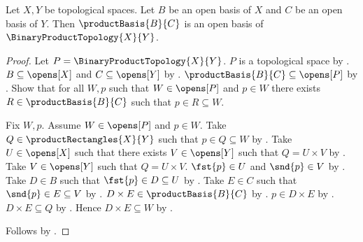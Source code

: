 \begin{theorem}\label{product_of_open_bases}
    Let $X,Y$ be topological spaces.
    Let $B$ be an open basis of $X$ and $C$ be an open basis of $Y$.
    Then $\productBasis{B}{C}$ is an open basis of $\BinaryProductTopology{X}{Y}$.
\end{theorem}
\begin{proof}
    Let $P=\BinaryProductTopology{X}{Y}$.
    $P$ is a topological space by .
    $B\subseteq\opens[X]$ and $C\subseteq\opens[Y]$ by .
    $\productBasis{B}{C}\subseteq\opens[P]$ by
        .
    Show that for all $W,p$ such that $W\in\opens[P]$ and $p\in W$
        there exists $R\in\productBasis{B}{C}$ such that $p\in R\subseteq W$.
    \begin{subproof}
        Fix $W,p$.
        Assume $W\in\opens[P]$ and $p\in W$.
        Take $Q\in\productRectangles{X}{Y}$ such that $p\in Q\subseteq W$
            by .
        Take $U\in\opens[X]$ such that there exists $V\in\opens[Y]$
            such that $Q=U\times V$ by .
        Take $V\in\opens[Y]$ such that $Q=U\times V$.
        $\fst{p}\in U$ and $\snd{p}\in V$ by .
        Take $D\in B$ such that $\fst{p}\in D\subseteq U$ by .
        Take $E\in C$ such that $\snd{p}\in E\subseteq V$ by .
        $D\times E\in\productBasis{B}{C}$ by .
        $p\in D\times E$ by .
        $D\times E\subseteq Q$ by .
        Hence $D\times E\subseteq W$ by .
    \end{subproof}
    Follows by .
\end{proof}
